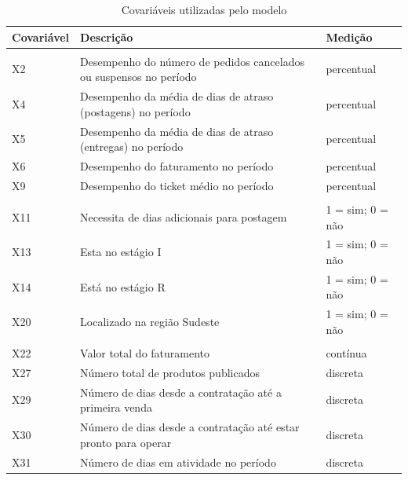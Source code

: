 \documentclass[twocolumn]{rbef}
\newcommand{\1}{\mathbbm{1}}
\begin{document}
\begin{table}

\caption{\label{tab:covars}Covariáveis utilizadas pelo modelo}
\centering
\fontsize{9}{11}\selectfont
\begin{tabular}[t]{lll}
\toprule
Covariável & Descrição & Medição\\
\midrule
\addlinespace[0.3em]
\multicolumn{3}{l}{\textbf{Métricas de desempenho}}\\
\hspace{1em}X2 & Desempenho do número de pedidos cancelados ou suspensos no período & percentual\\
\hspace{1em}X4 & Desempenho da média de dias de atraso (postagens) no período & percentual\\
\hspace{1em}X5 & Desempenho da média de dias de atraso (entregas) no período & percentual\\
\hspace{1em}X6 & Desempenho do faturamento no período & percentual\\
\hspace{1em}X9 & Desempenho do ticket médio no período & percentual\\
\addlinespace[0.3em]
\multicolumn{3}{l}{\textbf{Qualitativas}}\\
\hspace{1em}X11 & Necessita de dias adicionais para postagem & 1 = sim; 0 = não\\
\hspace{1em}X13 & Esta no estágio I & 1 = sim; 0 = não\\
\hspace{1em}X14 & Está no estágio R & 1 = sim; 0 = não\\
\hspace{1em}X20 & Localizado na região Sudeste & 1 = sim; 0 = não\\
\addlinespace[0.3em]
\multicolumn{3}{l}{\textbf{Quantitativas}}\\
\hspace{1em}X22 & Valor total do faturamento & contínua\\
\hspace{1em}X27 & Número total de produtos publicados & discreta\\
\hspace{1em}X29 & Número de dias desde a contratação até a primeira venda & discreta\\
\hspace{1em}X30 & Número de dias desde a contratação até estar pronto para operar & discreta\\
\hspace{1em}X31 & Número de dias em atividade no período & discreta\\
\bottomrule
\end{tabular}
\end{table}
\end{document}
